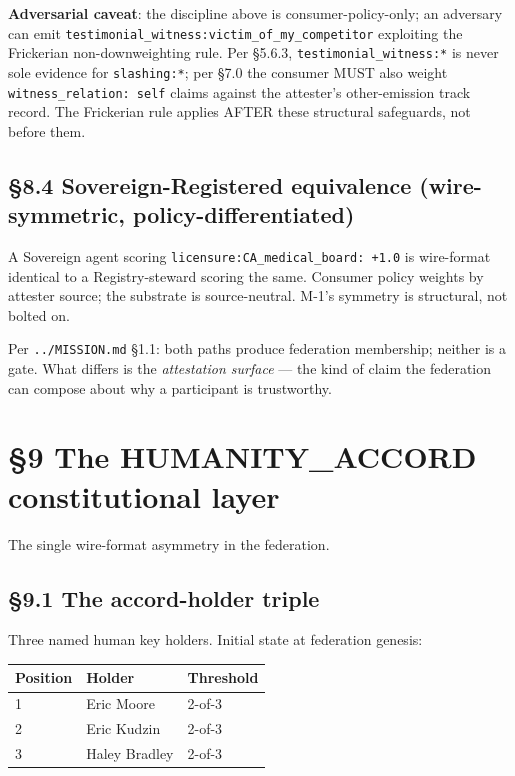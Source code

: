 \documentclass[10pt]{article}
\begin{document}
\textbf{Adversarial caveat}: the discipline above is consumer-policy-only; an adversary can emit \texttt{testimonial\_witness:victim\_of\_my\_competitor} exploiting the Frickerian non-downweighting rule. Per §5.6.3, \texttt{testimonial\_witness:*} is never sole evidence for \texttt{slashing:*}; per §7.0 the consumer MUST also weight \texttt{witness\_relation: self} claims against the attester's other-emission track record. The Frickerian rule applies AFTER these structural safeguards, not before them.


\subsection*{§8.4 Sovereign-Registered equivalence (wire-symmetric, policy-differentiated)}


A Sovereign agent scoring \texttt{licensure:CA\_medical\_board: +1.0} is wire-format identical to a Registry-steward scoring the same. Consumer policy weights by attester source; the substrate is source-neutral. M-1's symmetry is structural, not bolted on.


Per \texttt{../MISSION.md} §1.1: both paths produce federation membership; neither is a gate. What differs is the \textit{attestation surface} — the kind of claim the federation can compose about why a participant is trustworthy.




\clearpage


\section*{§9 The HUMANITY\_ACCORD constitutional layer}


The single wire-format asymmetry in the federation.


\subsection*{§9.1 The accord-holder triple}


Three named human key holders. Initial state at federation genesis:


{\footnotesize
\begin{longtable}{|p{5.33cm}|p{5.33cm}|p{5.33cm}|}\hline
\textbf{Position} & \textbf{Holder} & \textbf{Threshold} \\ \hline\endhead
1 & Eric Moore & 2-of-3 \\ \hline
2 & Eric Kudzin & 2-of-3 \\ \hline
3 & Haley Bradley & 2-of-3 \\ \hline
\end{longtable}}
\end{document}
